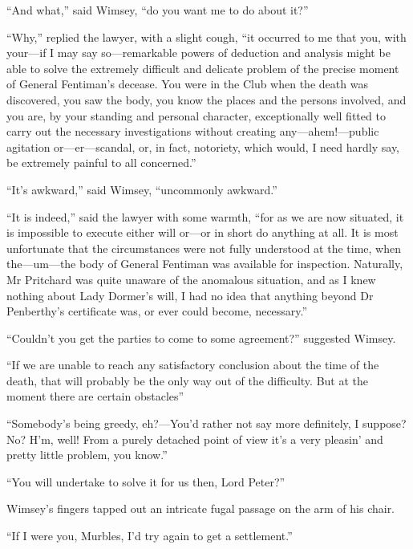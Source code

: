 \enquote{And what,} said Wimsey, \enquote{do you want me to do about it?}

\enquote{Why,} replied the lawyer, with a slight cough, \enquote{it occurred to me that you, with your\allowbreak---\allowbreak if I may say so\allowbreak---\allowbreak remarkable powers of deduction and analysis might be able to solve the extremely difficult and delicate problem of the precise moment of General Fentiman's decease. You were in the Club when the death was discovered, you saw the body, you know the places and the persons involved, and you are, by your standing and personal character, exceptionally well fitted to carry out the necessary investigations without creating any\allowbreak---\allowbreak ahem!---public agitation or\allowbreak---\allowbreak er---scandal, or, in fact, notoriety, which would, I need hardly say, be extremely painful to all concerned.}

\enquote{It's awkward,} said Wimsey, \enquote{uncommonly awkward.}

\enquote{It is indeed,} said the lawyer with some warmth, \enquote{for as we are now situated, it is impossible to execute either will or\allowbreak---\allowbreak or in short do anything at all. It is most unfortunate that the circumstances were not fully understood at the time, when the\allowbreak---\allowbreak um---the body of General Fentiman was available for inspection. Naturally, Mr Pritchard was quite unaware of the anomalous situation, and as I knew nothing about Lady Dormer's will, I had no idea that anything beyond Dr Penberthy's certificate was, or ever could become, necessary.}

\enquote{Couldn't you get the parties to come to some agreement?} suggested Wimsey.

\enquote{If we are unable to reach any satisfactory conclusion about the time of the death, that will probably be the only way out of the difficulty. But at the moment there are certain obstacles\longdash}

\enquote{Somebody's being greedy, eh?---You'd rather not say more definitely, I suppose? No? H'm, well! From a purely detached point of view it's a very pleasin' and pretty little problem, you know.}

\enquote{You will undertake to solve it for us then, Lord Peter?}

Wimsey's fingers tapped out an intricate fugal passage on the arm of his chair.

\enquote{If I were you, Murbles, I'd try again to get a settlement.}

